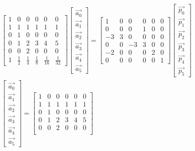 \documentclass{letter}
\begin{document}
\begin{align*}
\begin{bmatrix}
1 & 0 & 0 & 0 & 0 & 0 \\
1 & 1 & 1 & 1 & 1 & 1 \\
0 & 1 & 0 & 0 & 0 & 0 \\
0 & 1 & 2 & 3 & 4 & 5 \\
0 & 0 & 2 & 0 & 0 & 0 \\
1 & \frac{1}{2} & \frac{1}{4} & \frac{1}{8} & \frac{1}{16} & \frac{1}{32} 
\end{bmatrix}
\begin{bmatrix}
\vec{a_0} \\
\vec{a_1} \\
\vec{a_2} \\
\vec{a_3} \\
\vec{a_4} \\
\vec{a_5} 
\end{bmatrix}
=
\begin{bmatrix}
1 & 0 & 0 & 0 & 0 & 0 \\
0 & 0 & 0 & 1 & 0 & 0 \\
-3 & 3 & 0 & 0 & 0 & 0 \\
0 & 0 & -3 & 3 & 0 & 0 \\
-2 & 0 & 0 & 0 & 2 & 0 \\
0 & 0 & 0 & 0 & 0 & 1
\end{bmatrix}
\begin{bmatrix}
\vec{p_0} \\
\vec{p_1} \\
\vec{p_2} \\
\vec{p_3} \\
\vec{p_4} \\
\vec{p_5} 
\end{bmatrix}
\\
\begin{bmatrix}
\vec{a_0} \\
\vec{a_1} \\
\vec{a_2} \\
\vec{a_3} \\
\vec{a_4} \\
\vec{a_5} 
\end{bmatrix}
=
\begin{bmatrix}
1 & 0 & 0 & 0 & 0 & 0 \\
1 & 1 & 1 & 1 & 1 & 1 \\
0 & 1 & 0 & 0 & 0 & 0 \\
0 & 1 & 2 & 3 & 4 & 5 \\
0 & 0 & 2 & 0 & 0 & 0 \\

\end{bmatrix}
\end{align*}
\end{document}
